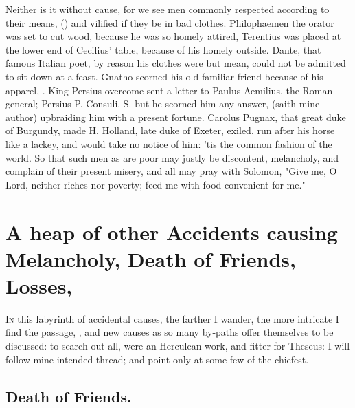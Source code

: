 Neither is it without cause, for we see men commonly respected according to
their means, () and vilified if they be in bad clothes.
Philophaemen the orator was set to cut wood, because he
was so homely attired, Terentius was placed at the lower
end of Cecilius' table, because of his homely outside.
Dante, that famous Italian poet, by reason his clothes
were but mean, could not be admitted to sit down at a feast. Gnatho scorned his
old familiar friend because of his apparel, . King Persius
overcome sent a letter to Paulus Aemilius, the Roman
general; Persius P. Consuli. S. but he scorned him any answer,  (saith mine author) upbraiding him with a present
fortune. Carolus Pugnax, that great duke of Burgundy, made
H. Holland, late duke of Exeter, exiled, run after his horse like a lackey, and
would take no notice of him: 'tis the common fashion of
the world. So that such men as are poor may justly be discontent, melancholy,
and complain of their present misery, and all may pray with
Solomon, "Give me, O Lord, neither riches nor poverty;
feed me with food convenient for me."

\section[Accidents, Death of Friends, Losses]{A heap of other Accidents causing
Melancholy, Death of Friends, Losses,
\etc{}}\label{sec:accidents-death-of-friends}

\lettrine{I}{n} this labyrinth of accidental causes, the farther I wander, the
more intricate I find the passage, , and new causes as so
many by-paths offer themselves to be discussed: to search out all, were an
Herculean work, and fitter for Theseus: I will follow mine intended thread; and
point only at some few of the chiefest.

\subsection{Death of Friends.}

